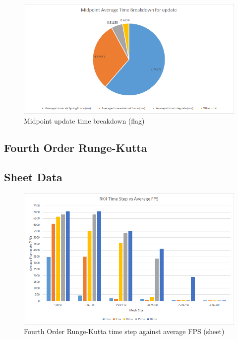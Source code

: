     \begin{figure}
    \begin{center}
      \includegraphics[scale=.9]{Figures/flag_m_ut}
    \end{center}
    \caption{Midpoint update time breakdown (flag)}
    \label{fig:m ut flag}
  \end{figure}

\begin{landscape}

\section{Fourth Order Runge-Kutta}

\subsection{Sheet Data}

  \begin{figure}[!htb]
    \begin{center}
      \includegraphics{Figures/sheet_rk4_fps}
    \end{center}
    \caption{Fourth Order Runge-Kutta time step against average FPS (sheet)}
    \label{fig:rk4 fps sheet}
  \end{figure}
\end{landscape}
  
